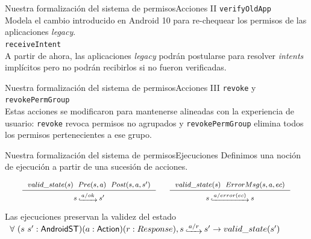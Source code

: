 \documentclass[pdf]{beamer} %
\begin{document}
\begin{frame}{Nuestra formalización del sistema de permisos}{Acciones II}
    \texttt{verifyOldApp}\\
    \vspace{5px}
    Modela el cambio introducido en Android 10 para re-chequear los permisos de las aplicaciones
    \textit{legacy}. \\
    \pause
    \vspace{10px}
    \texttt{receiveIntent}\\
    \vspace{5px}
    A partir de ahora, las aplicaciones \textit{legacy} podrán postularse para resolver
    \textit{intents} implícitos pero no podrán recibirlos si no fueron verificadas.
\end{frame}

\begin{frame}{Nuestra formalización del sistema de permisos}{Acciones III}
    \texttt{revoke} y \texttt{revokePermGroup}\\
    \vspace{5px}
    Estas acciones se modificaron para mantenerse alineadas con la experiencia de usuario:
    \texttt{revoke} revoca permisos no agrupados y \texttt{revokePermGroup} elimina todos los
    permisos pertenecientes a ese grupo.\\
\end{frame}


\begin{frame}{Nuestra formalización del sistema de permisos}{Ejecuciones}
    Definimos una noción de ejecución a partir de una sucesión de acciones.

    \begin{displaymath}
        \fontsize{8pt}{9pt}\selectfont
        \begin{array}{c}
            \inference[]{$$valid\_state(s)$$ \hspace{.2cm} $$Pre(s, a)$$ \hspace{.2cm} $$Post(s, a, s')$$}{$$s\step{a/ok}s'$$}
            \hspace{0.5cm}
            \inference[]{$$valid\_state(s)$$ \hspace{.2cm} $$ErrorMsg(s, a, ec)$$}{$$s\step{a/error(ec)}s$$}
        \end{array}
    \end{displaymath}
    \pause
    \begin{theorem}{Las ejecuciones preservan la validez del estado}
        \fontsize{9pt}{12pt}\selectfont
        $\begin{array}{l} \forall\ (s\ s':\AndroidState)(a:\Action) (r:Response), s\step{a/r}s'
                \rightarrow valid\_state(s')\end{array}$
    \end{theorem}
\end{frame}
\end{document}

